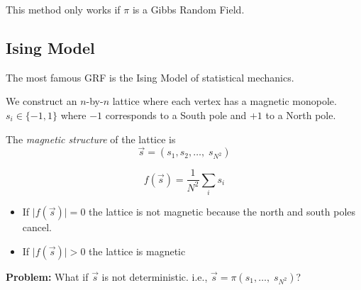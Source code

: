 \documentclass[12pt]{article}
\begin{document}
        This method only works if $\pi$ is a Gibbs Random Field. 

    \subsection{Ising Model}
        The most famous GRF is the Ising Model of statistical mechanics.

        We construct an $n$-by-$n$ lattice where each vertex has a magnetic monopole. $s_i \in \{-1, 1\}$ where $-1$ corresponds to a South pole and $+1$ to a North pole. 

        \begin{center}
        \end{center}

        The \emph{magnetic structure} of the lattice is 
        \[\vec s = (s_1, s_2, \dots,\; s_{N^2})\]
        
        \[f(\vec s) = \frac{1}{N^2} \sum_i s_i\]

        \begin{itemize}
            \item If $\big\vert f(\vec s) \big\vert = 0$ the lattice is not magnetic because the north and south poles cancel.
            \item If $\big\vert f(\vec s)\big\vert > 0$ the lattice is magnetic
        \end{itemize}

        \textbf{Problem:} What if $\vec s$ is not deterministic. i.e., $\vec s = \pi(s_1, \dots, \; s_{N^2})$? 
\end{document}
